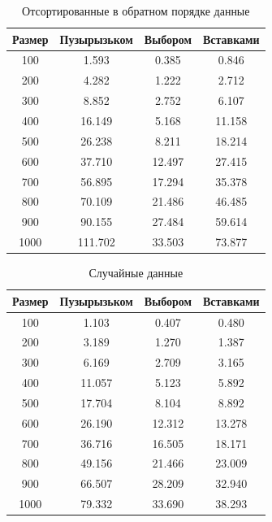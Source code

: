 \documentclass[a4paper,14pt, unknownkeysallowed]{extreport}
\begin{document}
\begin{table}[h]
	\begin{center}
		\begin{threeparttable}
		\captionsetup{justification=raggedleft,singlelinecheck=off}
		\caption{Отсортированные в обратном порядке данные}
		\label{tbl:worth}
		\begin{tabular}{|c|c|c|c|}
			\hline
			Размер & Пузырызьком & Выбором & Вставками \\
			\hline
			100    & 1.593   & 0.385  & 0.846 \\ 
			\hline
			200    & 4.282   & 1.222  & 2.712 \\ 
			\hline
			300    & 8.852   & 2.752  & 6.107 \\ 
			\hline
			400    & 16.149  & 5.168  & 11.158 \\ 
			\hline
			500    & 26.238  & 8.211  & 18.214 \\ 
			\hline
			600    & 37.710  & 12.497 & 27.415 \\ 
			\hline
			700    & 56.895  & 17.294 & 35.378 \\ 
			\hline
			800    & 70.109  & 21.486 & 46.485 \\ 
			\hline
			900    & 90.155  & 27.484 & 59.614 \\ 
			\hline
			1000   & 111.702 & 33.503 & 73.877 \\ 
			\hline
		\end{tabular}
		\end{threeparttable}
    \end{center}
\end{table}


\begin{table}[h]
	\begin{center}
		\begin{threeparttable}
		\captionsetup{justification=raggedleft,singlelinecheck=off}
		\caption{Случайные данные}
		\label{tbl:random}
		\begin{tabular}{|c|c|c|c|}
			\hline
			Размер & Пузырызьком & Выбором & Вставками \\
			\hline
			100    & 1.103  & 0.407  & 0.480 \\ 
			\hline
			200    & 3.189  & 1.270  & 1.387 \\ 
			\hline
			300    & 6.169  & 2.709  & 3.165 \\ 
			\hline
			400    & 11.057 & 5.123  & 5.892 \\ 
			\hline
			500    & 17.704 & 8.104  & 8.892 \\ 
			\hline
			600    & 26.190 & 12.312 & 13.278 \\ 
			\hline
			700    & 36.716 & 16.505 & 18.171 \\ 
			\hline
			800    & 49.156 & 21.466 & 23.009 \\ 
			\hline
			900    & 66.507 & 28.209 & 32.940 \\ 
			\hline
			1000   & 79.332 & 33.690 & 38.293 \\ 
			\hline
		\end{tabular}
		\end{threeparttable}
    \end{center}
\end{table}
\end{document}
